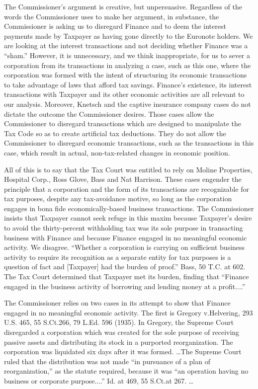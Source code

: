 \begin{select}
The Commissioner's argument is creative, but unpersuasive. Regardless of the words the Commissioner uses to make her argument, in substance, the Commissioner is asking us to disregard Finance and to deem the interest payments made by Taxpayer as having gone directly to the Euronote holders. We are looking at the interest transactions and not deciding whether Finance was a ``sham.'' However, it is unnecessary, and we think inappropriate, for us to sever a corporation from its transactions in analyzing a case, such as this one, where the corporation was formed with the intent of structuring its economic transactions to take advantage of laws that afford tax savings. Finance's existence, its interest transactions with Taxpayer and its other economic activities are all relevant to our analysis. Moreover, Knetsch and the captive insurance company cases do not dictate the outcome the Commissioner desires. Those cases allow the Commissioner to disregard transactions which are designed to manipulate the Tax Code so as to create artificial tax deductions. They do not allow the Commissioner to disregard economic transactions, such as the transactions in this case, which result in actual, non-tax-related changes in economic position.

All of this is to say that the Tax Court was entitled to rely on Moline Properties, Hospital Corp., Ross Glove, Bass and Nat Harrison. These cases engender the principle that a corporation and the form of its transactions are recognizable for tax purposes, despite any tax-avoidance motive, so long as the corporation engages in bona fide economically-based business transactions. The Commissioner insists that Taxpayer cannot seek refuge in this maxim because Taxpayer's desire to avoid the thirty-percent withholding tax was its sole purpose in transacting business with Finance and because Finance engaged in no meaningful economic activity. We disagree. ``Whether a corporation is carrying on sufficient business activity to require its recognition as a separate entity for tax purposes is a question of fact and [Taxpayer] had the burden of proof.'' Bass, 50 T.C. at 602. The Tax Court determined that Taxpayer met its burden, finding that ``Finance engaged in the business activity of borrowing and lending money at a profit....''

The Commissioner relies on two cases in its attempt to show that Finance engaged in no meaningful economic activity. The first is Gregory v.\@ Helvering, 293 U.S. 465, 55 S.Ct.\@ 266, 79 L.Ed. 596 (1935). In Gregory, the Supreme Court disregarded a corporation which was created for the sole purpose of receiving passive assets and distributing its stock in a purported reorganization. The corporation was liquidated six days after it was formed.  \ldots The Supreme Court ruled that the distribution was not made ``in pursuance of a plan of reorganization,'' as the statute required, because it was ``an operation having no business or corporate purpose....'' Id. at 469, 55 S.Ct.\@ at 267.   \ldots


\end{select}
